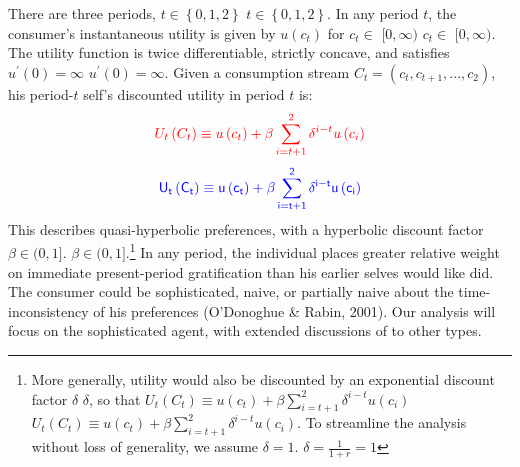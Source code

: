 \documentclass[11pt]{article}%
\providecommand{\DIFadd}[1]{{\protect\color{blue} \sf #1}} %
\providecommand{\DIFdel}[1]{{\protect\color{red} \scriptsize #1}} %
\providecommand{\DIFaddbegin}{} %
\providecommand{\DIFaddend}{} %
\providecommand{\DIFdelbegin}{} %
\providecommand{\DIFdelend}{} %
\begin{document}
There are three periods, \DIFdelbegin \DIFdel{$t\in \left\{ 0,1,2\right\} $}\DIFdelend \DIFaddbegin \DIFadd{$t\in\left\{  0,1,2\right\}  $}\DIFaddend . In any period $t$,
the consumer's instantaneous utility is given by $u\left(  c_{t}\right)  $ for
\DIFdelbegin \DIFdel{$c_{t}\in $ $[0,\infty )$}\DIFdelend \DIFaddbegin \DIFadd{$c_{t}\in$ $[0,\infty)$}\DIFaddend . The utility function is twice differentiable,
strictly concave, and satisfies \DIFdelbegin \DIFdel{$u^{\prime }\left( 0\right) =\infty $}\DIFdelend \DIFaddbegin \DIFadd{$u^{\prime}\left(  0\right)  =\infty$}\DIFaddend . Given a
consumption stream $C_{t}=\left(  c_{t},c_{t+1},...,c_{2}\right)  $,
\DIFdelbegin \DIFdel{his
}\DIFdelend \DIFaddbegin \DIFadd{period-$t$ self's }\DIFaddend discounted utility in period $t$ is:%
\DIFdelbegin \begin{displaymath}\DIFdel{
U_{t}\left( C_{t}\right) \equiv u\left( c_{t}\right) +\beta
\sum\limits_{i=t+1}^{2}\delta ^{i-t}u\left( c_{i}\right)
}\end{displaymath}%
\DIFdelend \DIFaddbegin \[\DIFadd{
U_{t}\left(  C_{t}\right)  \equiv u\left(  c_{t}\right)  +\beta\sum
\limits_{i=t+1}^{2}\delta^{i-t}u\left(  c_{i}\right)
}\]
\DIFaddend This describes quasi-hyperbolic preferences, with a hyperbolic discount factor
\DIFdelbegin \DIFdel{$\beta \in (0,1]$.}\DIFdelend \DIFaddbegin \DIFadd{$\beta\in(0,1]$.}\DIFaddend \footnote{%
More generally, utility would also be discounted by
an exponential discount factor \DIFdelbegin \DIFdel{$\delta $}\DIFdelend \DIFaddbegin \DIFadd{$\delta$}\DIFaddend , so that \DIFdelbegin \DIFdel{$U_{t}\left( C_{t}\right) \equiv u\left(
c_{t}\right) +\beta \sum\limits_{i=t+1}^{2}\delta ^{i-t}u\left( c_{i}\right) 
$}\DIFdelend \DIFaddbegin \DIFadd{$U_{t}\left(  C_{t}\right)
\equiv u\left(  c_{t}\right)  +\beta\sum\limits_{i=t+1}^{2}\delta
^{i-t}u\left(  c_{i}\right)  $}\DIFaddend . To streamline the analysis without loss of
generality, we assume \DIFdelbegin \DIFdel{$\delta
=1$.}\DIFdelend \DIFaddbegin \DIFadd{$\delta=\frac{1}{1+r}=1$}\DIFaddend } In any period, the individual
places greater relative weight on immediate \DIFaddbegin \DIFadd{present-period }\DIFaddend gratification than
his earlier selves \DIFdelbegin \DIFdel{would like}\DIFdelend \DIFaddbegin \DIFadd{did}\DIFaddend . The consumer could be sophisticated, naive, or
partially naive about the time-inconsistency of his preferences (O'Donoghue \&
Rabin, 2001). Our analysis will focus on the sophisticated agent, with
extended discussions \DIFdelbegin \DIFdel{of
}\DIFdelend \DIFaddbegin \DIFadd{to }\DIFaddend other types.
\end{document}
